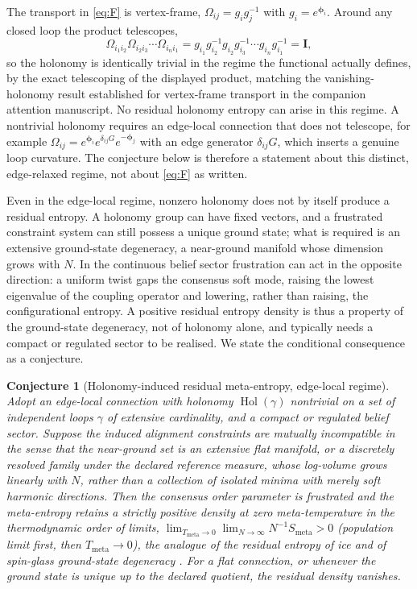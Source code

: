 \documentclass[11pt]{article}
\theoremstyle{plain}
\newtheorem{conjecture}{Conjecture}[section]
\theoremstyle{definition}
\newcommand{\holonomy}{\operatorname{Hol}}
\newcommand{\bphi}{\boldsymbol{\phi}}
\newcommand{\bI}{\mathbf{I}}
\newcommand{\Smeta}{S_{\mathrm{meta}}}
\newcommand{\Tmeta}{T_{\mathrm{meta}}}
\newcommand{\Omegaij}{\Omega_{ij}}
\begin{document}
The transport in \cref{eq:F} is vertex-frame, $\Omegaij=g_i g_j^{-1}$ with
$g_i=e^{\bphi_i}$. Around any closed loop the product telescopes,
\begin{equation}
\Omega_{i_1 i_2}\Omega_{i_2 i_3}\cdots\Omega_{i_n i_1}
=g_{i_1}g_{i_2}^{-1}g_{i_2}g_{i_3}^{-1}\cdots g_{i_n}g_{i_1}^{-1}=\bI,
\end{equation}
so the holonomy is identically trivial in the regime the functional actually defines, by the
exact telescoping of the displayed product, matching the vanishing-holonomy result established
for vertex-frame transport in the companion attention manuscript. No
residual holonomy entropy can arise in this regime. A nontrivial holonomy requires an
edge-local connection that does not telescope, for example
$\Omegaij=e^{\bphi_i}e^{\delta_{ij}G}e^{-\bphi_j}$ with an edge generator $\delta_{ij}G$,
which inserts a genuine loop curvature. The conjecture below is therefore a statement
about this distinct, edge-relaxed regime, not about \cref{eq:F} as written.

Even in the edge-local regime, nonzero holonomy does not by itself produce a residual
entropy. A holonomy group can have fixed vectors, and a frustrated constraint system can
still possess a unique ground state; what is required is an extensive ground-state
degeneracy, a near-ground manifold whose dimension grows with $N$. In the continuous
belief sector frustration can act in the opposite direction: a uniform twist gaps the
consensus soft mode, raising the lowest eigenvalue of the coupling operator and lowering,
rather than raising, the configurational entropy. A positive residual entropy density is
thus a property of the ground-state degeneracy, not of holonomy alone, and typically
needs a compact or regulated sector to be realised. We state the conditional consequence
as a conjecture.

\begin{conjecture}[Holonomy-induced residual meta-entropy, edge-local regime]
\label{conj:frustration}
Adopt an edge-local connection with holonomy $\holonomy(\gamma)$ nontrivial on a set of
independent loops $\gamma$ of extensive cardinality, and a compact or regulated belief
sector. Suppose the induced alignment constraints are mutually incompatible in the sense
that the near-ground set is an extensive flat manifold, or a discretely resolved family under the
declared reference measure, whose log-volume grows linearly with $N$, rather than a collection of
isolated minima with merely soft harmonic directions. Then the
consensus order parameter is frustrated and the meta-entropy retains a strictly positive
density at zero meta-temperature in the thermodynamic order of limits,
$\lim_{\Tmeta\to0}\lim_{N\to\infty} N^{-1}\Smeta>0$ (population limit first, then
$\Tmeta\to0$), the analogue of the residual entropy of ice \citep{pauling1935structure} and
of spin-glass
ground-state degeneracy \citep{mezard1987spin}. For a flat connection, or whenever the
ground state is unique up to the declared quotient, the residual density vanishes.
\end{conjecture}
\end{document}
